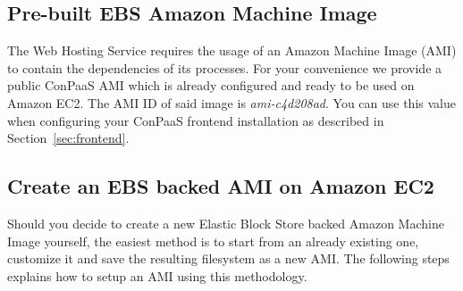\documentclass[10pt]{article}
\begin{document}
\subsection{Pre-built EBS Amazon Machine Image}

The Web Hosting Service requires the usage of an Amazon Machine Image (AMI) to
contain the dependencies of its processes. For your convenience we provide a
public ConPaaS AMI which is already configured and ready to be used on Amazon
EC2. The AMI ID of said image is \emph{ami-c4d208ad}. You can use this value
when configuring your ConPaaS frontend installation as described in
Section~\ref{sec:frontend}.

\subsection{Create an EBS backed AMI on Amazon EC2}
\label{sec:ec2image}

Should you decide to create a new Elastic Block Store backed Amazon Machine
Image yourself, the easiest method is to start from an already existing one,
customize it and save the resulting filesystem as a new AMI. The following
steps explains how to setup an AMI using this methodology.
\end{document}

